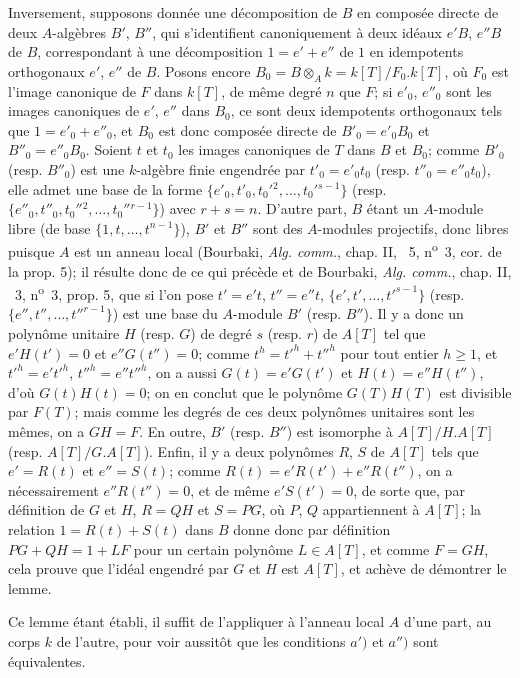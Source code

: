 Inversement, supposons donnée une décomposition de $B$ en composée directe de deux $A$-algèbres $B'$, $B''$, qui s'identifient canoniquement à deux idéaux $e'B$, $e''B$ de $B$, correspondant à une décomposition $1=e'+e''$ de $1$ en idempotents orthogonaux $e'$, $e''$ de $B$. Posons encore $B_0=B\otimes_A k=k[T]/F_0.k[T]$, où $F_0$ est l'image canonique de $F$ dans $k[T]$, de même degré $n$ que $F$; si $e'_0$, $e''_0$ sont les images canoniques de $e'$, $e''$ dans $B_0$, ce sont deux idempotents orthogonaux tels que $1=e'_0+e''_0$, et $B_0$ est donc composée directe de $B'_0=e'_0B_0$ et $B''_0=e''_0B_0$. Soient $t$ et $t_0$ les images canoniques de $T$ dans $B$ et $B_0$; comme $B'_0$ (resp. $B''_0$) est une $k$-algèbre finie engendrée par $t'_0=e'_0t_0$ (resp. $t''_0=e''_0t_0$), elle admet une base de la forme $\{e'_0,t'_0,t_0'{}^2,\ldots,t_0'{}^{s-1}\}$ (resp. $\{e''_0,t''_0,t_0''{}^2,\ldots,t_0''{}^{r-1}\}$) avec $r+s=n$. D'autre part, $B$ étant un $A$-module libre (de base $\{1,t,\ldots,t^{n-1}\}$), $B'$ et $B''$ sont des $A$-modules projectifs, donc libres puisque $A$ est un anneau local (Bourbaki, \emph{Alg. comm.}, chap. II, \textsection~5, n\textsuperscript{o}~3, cor. de la prop. 5); il résulte donc de ce qui précède et de Bourbaki, \emph{Alg. comm.}, chap. II, \textsection~3, n\textsuperscript{o}~3, prop. 5, que si l'on pose $t'=e't$, $t''=e''t$, $\{e',t',\ldots,t'^{s-1}\}$ (resp. $\{e'',t'',\ldots,t''^{r-1}\}$) est une base du $A$-module $B'$ (resp. $B''$). Il y a donc un polynôme unitaire $H$ (resp. $G$) de degré $s$ (resp. $r$) de $A[T]$ tel que $e'H(t')=0$ et $e''G(t'')=0$; comme $t^h=t'^h+t''^h$ pour tout entier $h\geq1$, et $t'^h=e't'^h$, $t''^h=e''t''^h$, on a aussi $G(t)=e'G(t')$ et $H(t)=e''H(t'')$, d'où $G(t)H(t)=0$; on en conclut que le polynôme $G(T)H(T)$ est divisible par $F(T)$; mais comme les degrés de ces deux polynômes unitaires sont les mêmes, on a $GH=F$. En outre, $B'$ (resp. $B''$) est isomorphe à $A[T]/H.A[T]$ (resp. $A[T]/G.A[T]$). Enfin, il y a deux polynômes $R$, $S$ de $A[T]$ tels que $e'=R(t)$ et $e''=S(t)$; comme $R(t)=e'R(t')+e''R(t'')$, on a nécessairement $e''R(t'')=0$, et de même $e'S(t')=0$, de sorte que, par définition de $G$ et $H$, $R=QH$ et $S=PG$, où $P$, $Q$ appartiennent à $A[T]$; la relation $1=R(t)+S(t)$ dans $B$ donne donc par définition $PG+QH=1+LF$ pour un certain polynôme $L\in A[T]$, et comme $F=GH$, cela prouve que l'idéal engendré par $G$ et $H$ est $A[T]$, et achève de démontrer le lemme.

Ce lemme étant établi, il suffit de l'appliquer à l'anneau local $A$ d'une part, au corps $k$ de l'autre, pour voir aussitôt que les conditions $a')$ et $a'')$ sont équivalentes.

